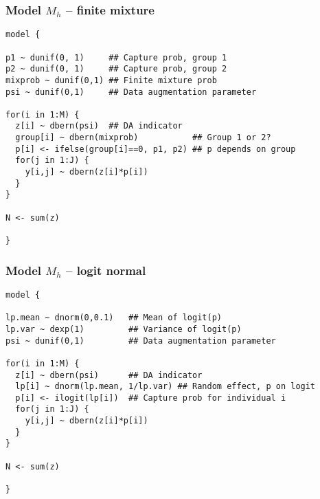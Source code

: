 \documentclass[color=usenames,dvipsnames]{beamer}\usepackage[]{graphicx}\usepackage[]{xcolor}
\makeatletter
\newenvironment{kframe}{%
 \def\at@end@of@kframe{}%
 \ifinner\ifhmode%
  \def\at@end@of@kframe{\end{minipage}}%
  \begin{minipage}{\columnwidth}%
 \fi\fi%
 \def\FrameCommand##1{\hskip\@totalleftmargin \hskip-\fboxsep
 \colorbox{shadecolor}{##1}\hskip-\fboxsep
     \hskip-\linewidth \hskip-\@totalleftmargin \hskip\columnwidth}%
 \MakeFramed {\advance\hsize-\width
   \@totalleftmargin\z@ \linewidth\hsize
   \@setminipage}}%
 {\par\unskip\endMakeFramed%
 \at@end@of@kframe}
\newenvironment{knitrout}{}{} %
\makeatother
\begin{document}
\begin{frame}[fragile]
  \frametitle{Model $M_h$ -- finite mixture}
\vspace{-3pt}
\begin{knitrout}\footnotesize
{}\color{fgcolor}\begin{kframe}
\begin{verbatim}
model {

p1 ~ dunif(0, 1)     ## Capture prob, group 1
p2 ~ dunif(0, 1)     ## Capture prob, group 2
mixprob ~ dunif(0,1) ## Finite mixture prob
psi ~ dunif(0,1)     ## Data augmentation parameter

for(i in 1:M) {     
  z[i] ~ dbern(psi)  ## DA indicator
  group[i] ~ dbern(mixprob)           ## Group 1 or 2?
  p[i] <- ifelse(group[i]==0, p1, p2) ## p depends on group
  for(j in 1:J) {
    y[i,j] ~ dbern(z[i]*p[i])
  }
}

N <- sum(z)

}
\end{verbatim}
\end{kframe}
\end{knitrout}
\end{frame}



\begin{frame}[fragile]
  \frametitle{Model $M_h$ -- logit normal}
\vspace{-3pt}
\begin{knitrout}\footnotesize
{}\color{fgcolor}\begin{kframe}
\begin{verbatim}
model {

lp.mean ~ dnorm(0,0.1)   ## Mean of logit(p)
lp.var ~ dexp(1)         ## Variance of logit(p)
psi ~ dunif(0,1)         ## Data augmentation parameter

for(i in 1:M) {     
  z[i] ~ dbern(psi)      ## DA indicator
  lp[i] ~ dnorm(lp.mean, 1/lp.var) ## Random effect, p on logit
  p[i] <- ilogit(lp[i])  ## Capture prob for individual i
  for(j in 1:J) {
    y[i,j] ~ dbern(z[i]*p[i])
  }
}

N <- sum(z)

}
\end{verbatim}
\end{kframe}
\end{knitrout}
\end{frame}




\end{document}
